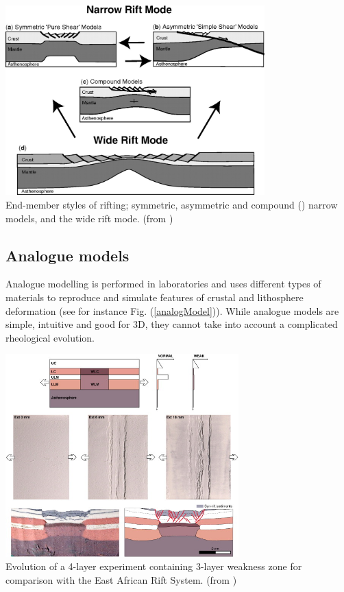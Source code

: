 \begin{center}
\centering
\includegraphics[width=10cm]{python_codes/fieldstone_178/images/Lfig1.jpg}\\
{\captionfont End-member styles of rifting; symmetric, asymmetric and compound (\cite{lies86}) narrow models, 
and the wide rift mode. (from \cite{hube07})}
\label{conceptModel}
\end{center}

\subsection*{Analogue models}

Analogue modelling is performed in laboratories and uses different types of materials to reproduce and simulate 
features of crustal and lithosphere deformation (see for instance Fig. (\ref{analogModel})). While analogue models 
are simple, intuitive and good for 3D, they cannot take into account a complicated rheological evolution. 

\begin{center}
\includegraphics[width=9cm]{python_codes/fieldstone_178/images/Lfig2.jpg}\\
{\captionfont Evolution of a 4-layer experiment containing 3-layer weakness zone for comparison with 
the East African Rift System. (from \cite{cort12})}
\label{analogModel}
\end{center}

